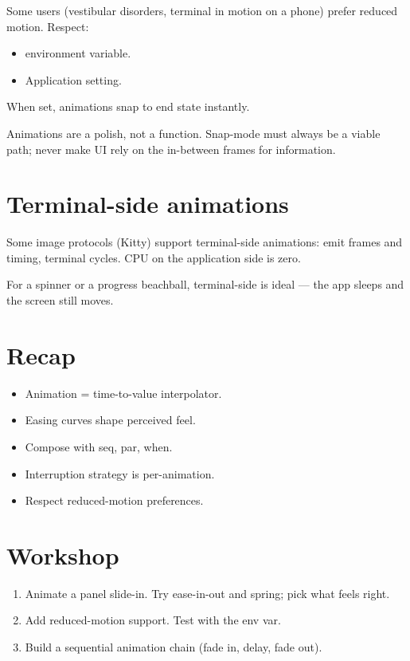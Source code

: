Some users (vestibular disorders, terminal in motion on a
phone) prefer reduced motion. Respect:

\begin{itemize}[leftmargin=*]
  \item {} environment variable.
  \item Application setting.
\end{itemize}

When set, animations snap to end state instantly.

\begin{warning}
Animations are a polish, not a function. Snap-mode must
always be a viable path; never make UI rely on the
in-between frames for information.
\end{warning}

\section{Terminal-side animations}

Some image protocols (Kitty) support terminal-side
animations: emit frames and timing, terminal cycles. CPU on
the application side is zero.

For a spinner or a progress beachball, terminal-side is
ideal --- the app sleeps and the screen still moves.

\section{Recap}

\begin{recap}
\begin{itemize}[leftmargin=*]
  \item Animation = time-to-value interpolator.
  \item Easing curves shape perceived feel.
  \item Compose with seq, par, when.
  \item Interruption strategy is per-animation.
  \item Respect reduced-motion preferences.
\end{itemize}
\end{recap}

\section*{Workshop}

\begin{enumerate}[leftmargin=*]
  \item Animate a panel slide-in. Try ease-in-out and
    spring; pick what feels right.
  \item Add reduced-motion support. Test with the env var.
  \item Build a sequential animation chain (fade in,
    delay, fade out).
\end{enumerate}
